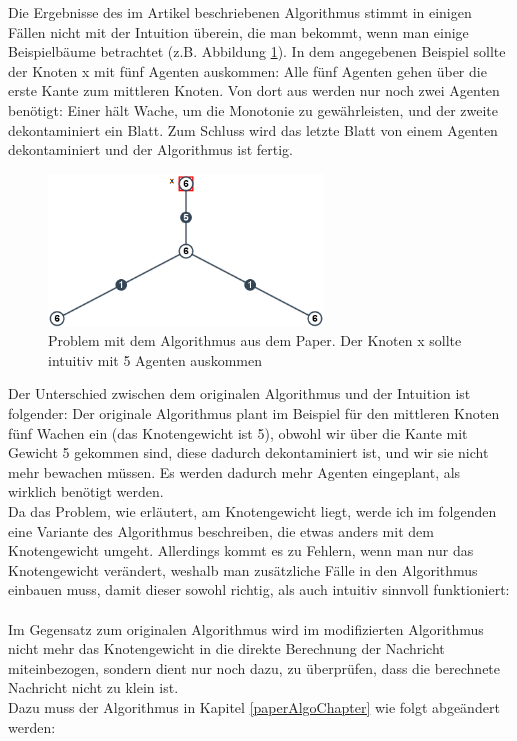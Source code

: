 
Die Ergebnisse des im Artikel beschriebenen Algorithmus stimmt in einigen Fällen nicht mit der Intuition überein, die man bekommt, wenn man einige Beispielbäume betrachtet (z.B. Abbildung \ref{fig:negBeispielPaperAlgo}). In dem  angegebenen Beispiel sollte der Knoten x mit fünf Agenten auskommen: Alle fünf Agenten gehen über die erste Kante zum mittleren Knoten. Von dort aus werden nur noch zwei Agenten benötigt: Einer hält Wache, um die Monotonie zu gewährleisten, und der zweite dekontaminiert ein Blatt. Zum Schluss wird das letzte Blatt von einem Agenten dekontaminiert und der Algorithmus ist fertig.

		\begin{figure}[htb]
			\includegraphics[width=0.65\textwidth]{bilder/abb_paper_problem.png}
			\captionsetup{width=0.65\textwidth}
			\caption{Problem mit dem Algorithmus aus dem Paper. Der Knoten x sollte intuitiv mit 5 Agenten auskommen}
			\label{fig:negBeispielPaperAlgo}
		\end{figure}

Der Unterschied zwischen dem originalen Algorithmus und der Intuition ist folgender: Der originale Algorithmus plant im Beispiel für den mittleren Knoten fünf Wachen ein (das Knotengewicht ist 5), obwohl wir über die Kante mit Gewicht 5 gekommen sind, diese dadurch dekontaminiert ist, und wir sie nicht mehr bewachen müssen. Es werden dadurch mehr Agenten eingeplant, als wirklich benötigt werden.
\\
Da das Problem, wie erläutert, am Knotengewicht liegt, werde ich im folgenden eine Variante des Algorithmus beschreiben, die etwas anders mit dem Knotengewicht umgeht. Allerdings kommt es zu Fehlern, wenn man nur das Knotengewicht verändert, weshalb man zusätzliche Fälle in den Algorithmus einbauen muss, damit dieser sowohl richtig, als auch intuitiv sinnvoll funktioniert:
\\
\\
Im Gegensatz zum originalen Algorithmus wird im modifizierten Algorithmus nicht mehr das Knotengewicht in die direkte Berechnung der Nachricht miteinbezogen, sondern dient nur noch dazu, zu überprüfen, dass die berechnete Nachricht nicht zu klein ist.
\\
Dazu muss der Algorithmus in Kapitel \ref{paperAlgoChapter} wie folgt abgeändert werden:


